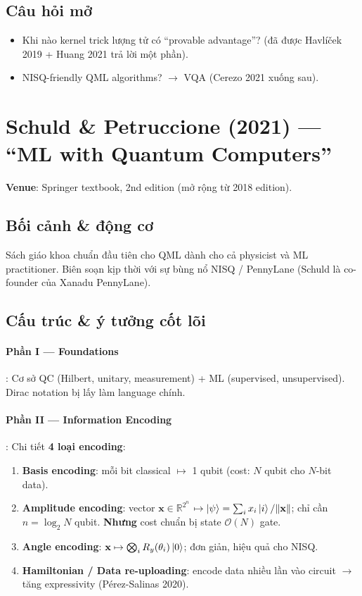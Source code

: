 \documentclass[11pt,a4paper]{article}
\begin{document}
\subsection{Câu hỏi mở}
\begin{itemize}
  \item Khi nào kernel trick lượng tử có ``provable advantage''? (đã được Havlíček 2019 + Huang 2021 trả lời một phần).
  \item NISQ-friendly QML algorithms? $\rightarrow$ VQA (Cerezo 2021 xuống sau).
\end{itemize}

\section{Schuld \& Petruccione (2021) --- ``ML with Quantum Computers''}

\textbf{Venue}: Springer textbook, 2nd edition (mở rộng từ 2018 edition).

\subsection{Bối cảnh \& động cơ}

Sách giáo khoa chuẩn đầu tiên cho QML dành cho cả physicist và ML practitioner. Biên soạn kịp thời với sự bùng nổ NISQ / PennyLane (Schuld là co-founder của Xanadu PennyLane).

\subsection{Cấu trúc \& ý tưởng cốt lõi}

\paragraph{Phần I --- Foundations}: Cơ sở QC (Hilbert, unitary, measurement) + ML (supervised, unsupervised). Dirac notation bị lấy làm language chính.

\paragraph{Phần II --- Information Encoding}: Chi tiết \textbf{4 loại encoding}:
\begin{enumerate}
  \item \textbf{Basis encoding}: mỗi bit classical $\mapsto$ 1 qubit (cost: $N$ qubit cho $N$-bit data).
  \item \textbf{Amplitude encoding}: vector $\mathbf{x} \in \mathbb{R}^{2^n}$ $\mapsto \ket{\psi} = \sum_i x_i \ket{i}/\|\mathbf{x}\|$; chỉ cần $n = \log_2 N$ qubit. \textbf{Nhưng} cost chuẩn bị state $\mathcal{O}(N)$ gate.
  \item \textbf{Angle encoding}: $\mathbf{x} \mapsto \bigotimes_i R_y(\theta_i) \ket{0}$; đơn giản, hiệu quả cho NISQ.
  \item \textbf{Hamiltonian / Data re-uploading}: encode data nhiều lần vào circuit $\rightarrow$ tăng expressivity (Pérez-Salinas 2020).
\end{enumerate}
\end{document}
